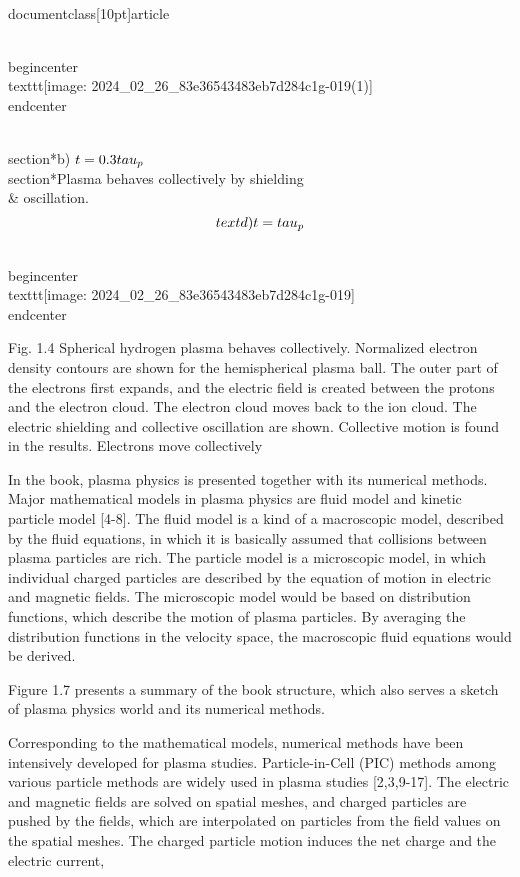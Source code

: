 \\documentclass[10pt]{article}
\begin{document}
\\begin{center}
\\texttt{[image: 2024\_02\_26\_83e36543483eb7d284c1g-019(1)]}
\\end{center}

\\section*{b) $t=0.3 \\tau_{p}$}
\\section*{Plasma behaves collectively by shielding \\& oscillation.}
$$
\\text { d) } t=\\tau_{p}
$$

\\begin{center}
\\texttt{[image: 2024\_02\_26\_83e36543483eb7d284c1g-019]}
\\end{center}

Fig. 1.4 Spherical hydrogen plasma behaves collectively. Normalized electron density contours are shown for the hemispherical plasma ball. The outer part of the electrons first expands, and the electric field is created between the protons and the electron cloud. The electron cloud moves back to the ion cloud. The electric shielding and collective oscillation are shown. Collective motion is found in the results. Electrons move collectively

In the book, plasma physics is presented together with its numerical methods. Major mathematical models in plasma physics are fluid model and kinetic particle model [4-8]. The fluid model is a kind of a macroscopic model, described by the fluid equations, in which it is basically assumed that collisions between plasma particles are rich. The particle model is a microscopic model, in which individual charged particles are described by the equation of motion in electric and magnetic fields. The microscopic model would be based on distribution functions, which describe the motion of plasma particles. By averaging the distribution functions in the velocity space, the macroscopic fluid equations would be derived.

Figure 1.7 presents a summary of the book structure, which also serves a sketch of plasma physics world and its numerical methods.

Corresponding to the mathematical models, numerical methods have been intensively developed for plasma studies. Particle-in-Cell (PIC) methods among various particle methods are widely used in plasma studies [2,3,9-17]. The electric and magnetic fields are solved on spatial meshes, and charged particles are pushed by the fields, which are interpolated on particles from the field values on the spatial meshes. The charged particle motion induces the net charge and the electric current,
\end{document}
